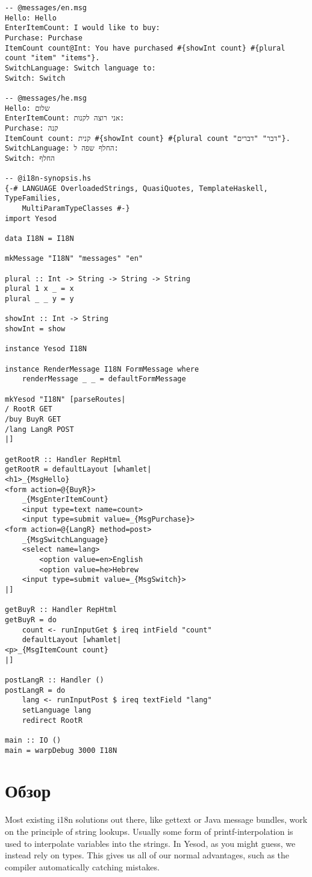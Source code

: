 \begin{lstlisting}
-- @messages/en.msg
Hello: Hello
EnterItemCount: I would like to buy: 
Purchase: Purchase
ItemCount count@Int: You have purchased #{showInt count} #{plural count "item" "items"}.
SwitchLanguage: Switch language to: 
Switch: Switch

-- @messages/he.msg
Hello: שלום
EnterItemCount: אני רוצה לקנות: 
Purchase: קנה
ItemCount count: קנית #{showInt count} #{plural count "דבר" "דברים"}.
SwitchLanguage: החלף שפה ל:
Switch: החלף

-- @i18n-synopsis.hs
{-# LANGUAGE OverloadedStrings, QuasiQuotes, TemplateHaskell, TypeFamilies,
    MultiParamTypeClasses #-}
import Yesod

data I18N = I18N

mkMessage "I18N" "messages" "en"

plural :: Int -> String -> String -> String
plural 1 x _ = x
plural _ _ y = y

showInt :: Int -> String
showInt = show

instance Yesod I18N

instance RenderMessage I18N FormMessage where
    renderMessage _ _ = defaultFormMessage

mkYesod "I18N" [parseRoutes|
/ RootR GET
/buy BuyR GET
/lang LangR POST
|]

getRootR :: Handler RepHtml
getRootR = defaultLayout [whamlet|
<h1>_{MsgHello}
<form action=@{BuyR}>
    _{MsgEnterItemCount}
    <input type=text name=count>
    <input type=submit value=_{MsgPurchase}>
<form action=@{LangR} method=post>
    _{MsgSwitchLanguage}
    <select name=lang>
        <option value=en>English
        <option value=he>Hebrew
    <input type=submit value=_{MsgSwitch}>
|]

getBuyR :: Handler RepHtml
getBuyR = do
    count <- runInputGet $ ireq intField "count"
    defaultLayout [whamlet|
<p>_{MsgItemCount count}
|]

postLangR :: Handler ()
postLangR = do
    lang <- runInputPost $ ireq textField "lang"
    setLanguage lang
    redirect RootR

main :: IO ()
main = warpDebug 3000 I18N
\end{lstlisting}

\section{Обзор} %

Most existing i18n solutions out there, like gettext or Java message bundles, work on the principle of string lookups. Usually some form of printf-interpolation is used to interpolate variables into the strings. In Yesod, as you might guess, we instead rely on types. This gives us all of our normal advantages, such as the compiler automatically catching mistakes.

